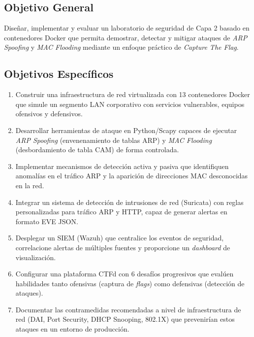 \documentclass[12pt, a4paper]{article}
\begin{document}
\subsection{Objetivo General}

Dise\~nar, implementar y evaluar un laboratorio de seguridad de Capa 2 basado en contenedores Docker que permita demostrar, detectar y mitigar ataques de \textit{ARP Spoofing} y \textit{MAC Flooding} mediante un enfoque pr\'actico de \textit{Capture The Flag}.

\subsection{Objetivos Espec\'ificos}

\begin{enumerate}[leftmargin=2cm]
    \item Construir una infraestructura de red virtualizada con 13 contenedores Docker que simule un segmento LAN corporativo con servicios vulnerables, equipos ofensivos y defensivos.

    \item Desarrollar herramientas de ataque en Python/Scapy capaces de ejecutar \textit{ARP Spoofing} (envenenamiento de tablas ARP) y \textit{MAC Flooding} (desbordamiento de tabla CAM) de forma controlada.

    \item Implementar mecanismos de detecci\'on activa y pasiva que identifiquen anomal\'ias en el tr\'afico ARP y la aparici\'on de direcciones MAC desconocidas en la red.

    \item Integrar un sistema de detecci\'on de intrusiones de red (Suricata) con reglas personalizadas para tr\'afico ARP y HTTP, capaz de generar alertas en formato EVE JSON.

    \item Desplegar un SIEM (Wazuh) que centralice los eventos de seguridad, correlacione alertas de m\'ultiples fuentes y proporcione un \textit{dashboard} de visualizaci\'on.

    \item Configurar una plataforma CTFd con 6 desaf\'ios progresivos que eval\'uen habilidades tanto ofensivas (captura de \textit{flags}) como defensivas (detecci\'on de ataques).

    \item Documentar las contramedidas recomendadas a nivel de infraestructura de red (DAI, Port Security, DHCP Snooping, 802.1X) que prevenir\'ian estos ataques en un entorno de producci\'on.
\end{enumerate}
\end{document}
